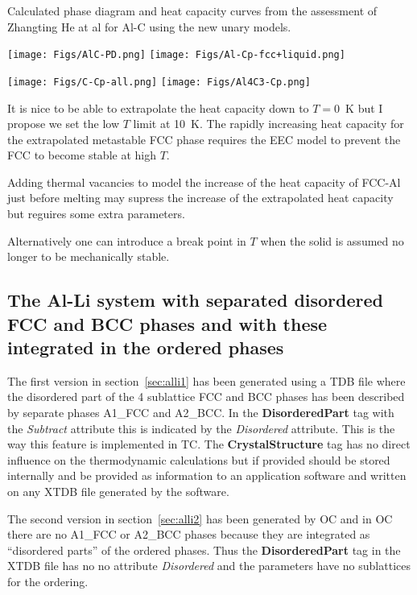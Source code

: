 \documentclass{article}
\begin{document}
\begin{appendices}
\newpage

Calculated phase diagram and heat capacity curves from the assessment
of Zhangting He at al for Al-C using the new unary models.

\texttt{[image: Figs/AlC-PD.png]}
\texttt{[image: Figs/Al-Cp-fcc+liquid.png]}

\texttt{[image: Figs/C-Cp-all.png]}
\texttt{[image: Figs/Al4C3-Cp.png]}

It is nice to be able to extrapolate the heat capacity down to $T=0$~K
but I propose we set the low $T$ limit at 10~K.  The rapidly
increasing heat capacity for the extrapolated metastable FCC phase
requires the EEC model to prevent the FCC to become stable at high $T$.

Adding thermal vacancies to model the increase of the heat capacity of
FCC-Al just before melting may supress the increase of the
extrapolated heat capacity but reguires some extra parameters.

Alternatively one can introduce a break point in $T$ when the solid is
assumed no longer to be mechanically stable.

\newpage

\subsection{The Al-Li system with separated disordered FCC and BCC phases
  and with these integrated in the ordered phases}

The first version in section~\ref{sec:alli1} has been generated using
a TDB file where the disordered part of the 4 sublattice FCC and BCC
phases has been described by separate phases A1\_FCC and A2\_BCC.  In
the {\bf DisorderedPart} tag with the {\em Subtract} attribute this is
indicated by the {\em Disordered} attribute.  This is the way this
feature is implemented in TC.  The {\bf CrystalStructure} tag has no
direct influence on the thermodynamic calculations but if provided
should be stored internally and be provided as information to an
application software and written on any XTDB file generated by the
software.

The second version in section~\ref{sec:alli2} has been generated by OC
and in OC there are no A1\_FCC or A2\_BCC phases because they are
integrated as ``disordered parts'' of the ordered phases.  Thus the
{\bf DisorderedPart} tag in the XTDB file has no no attribute {\em
  Disordered} and the parameters have no sublattices for the ordering.


\end{appendices}
\end{document}
